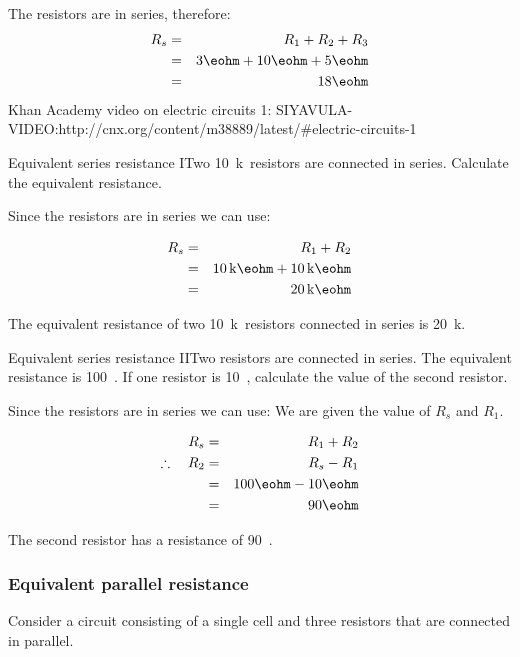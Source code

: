 The resistors are in series, therefore:
\begin{eqnarray*}
R_s&=&R_{1}+R_{2}+R_{3}\\
&=&3\eohm+10\eohm+5\eohm\\
&=&18\eohm
\end{eqnarray*}
Khan Academy video on electric circuits 1: SIYAVULA-VIDEO:http://cnx.org/content/m38889/latest/#electric-circuits-1
\begin{wex}{Equivalent series resistance I}{Two 10~k\ohm\ resistors are connected in series. Calculate the equivalent resistance.}{

Since the resistors are in series we can use:

\begin{eqnarray*}
R_s&=&R_{1}+R_{2}\\
&=&10\,\rm{k}\eohm+10\,\rm{k}\eohm\\
&=&20\,\rm{k}\eohm
\end{eqnarray*}

The equivalent resistance of two 10~k\ohm\ resistors connected in series is 20~k\ohm.}
\end{wex}

\begin{wex}{Equivalent series resistance II}{Two resistors are connected in series. The equivalent resistance is 100~\ohm. If one resistor is 10~\ohm, calculate the value of the second resistor.}{

Since the resistors are in series we can use:
We are given the value of $R_s$ and $R_1$.

\begin{eqnarray*}
R_s&=&R_{1}+R_{2}\\
\therefore\quad R_2&=&R_s-R_1\\
&=&100\eohm-10\eohm\\
&=&90\eohm
\end{eqnarray*}

The second resistor has a resistance of 90~\ohm.}
\end{wex}

\subsubsection{Equivalent parallel resistance}
Consider a circuit consisting of a single cell and three resistors that are connected in parallel.

